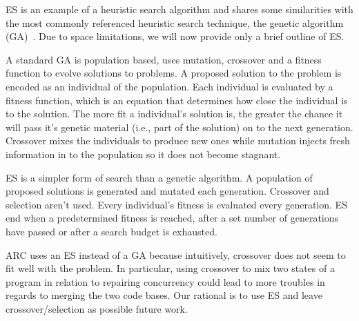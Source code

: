ES is an example of a heuristic search algorithm and shares some similarities  with the most commonly
referenced heuristic search technique, the genetic algorithm
(GA)~\cite{GA92}. Due to space limitations, we will now provide only a brief outline of ES.

A standard GA is population based, uses mutation, crossover and a fitness
function to evolve solutions to problems. A proposed solution to the problem is
encoded as an individual of the population. Each individual is evaluated by a
fitness function, which is an equation that determines how close the individual
is to the solution. The more fit a individual's solution is, the greater the
chance it will pass it's genetic material (i.e., part of the solution) on to
the next generation.
Crossover mixes the individuals to produce new ones while mutation injects
fresh information in to the population so it does not become stagnant.

ES is a simpler form of search than a genetic algorithm. A population of
proposed solutions is generated and mutated each generation. Crossover and
selection aren't used. Every individual's fitness is evaluated every
generation. ES end when a predetermined fitness is reached, after a set number
of generations have passed or after a search budget is exhausted.

ARC uses an ES instead of a GA because intuitively, crossover does not seem to fit
well with the problem. In particular, using crossover to mix two states of a program in relation to repairing
concurrency could lead to more troubles in regards to merging the two code
bases. Our rational is to use ES and leave crossover/selection as possible
future work.
